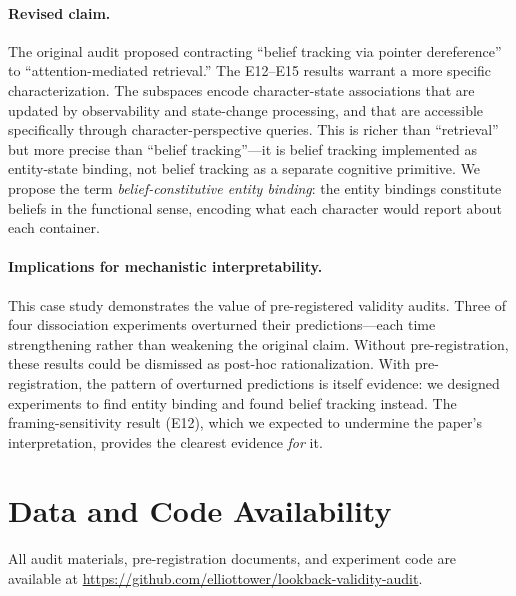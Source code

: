 \documentclass[11pt]{article}
\begin{document}
\paragraph{Revised claim.}
The original audit proposed contracting ``belief tracking via pointer dereference'' to ``attention-mediated retrieval.'' The E12--E15 results warrant a more specific characterization. The subspaces encode character-state associations that are updated by observability and state-change processing, and that are accessible specifically through character-perspective queries. This is richer than ``retrieval'' but more precise than ``belief tracking''---it is belief tracking implemented as entity-state binding, not belief tracking as a separate cognitive primitive. We propose the term \emph{belief-constitutive entity binding}: the entity bindings constitute beliefs in the functional sense, encoding what each character would report about each container.

\paragraph{Implications for mechanistic interpretability.}
This case study demonstrates the value of pre-registered validity audits. Three of four dissociation experiments overturned their predictions---each time strengthening rather than weakening the original claim. Without pre-registration, these results could be dismissed as post-hoc rationalization. With pre-registration, the pattern of overturned predictions is itself evidence: we designed experiments to find entity binding and found belief tracking instead. The framing-sensitivity result (E12), which we expected to undermine the paper's interpretation, provides the clearest evidence \emph{for} it.


\section*{Data and Code Availability}

All audit materials, pre-registration documents, and experiment code are available at \url{https://github.com/elliottower/lookback-validity-audit}.



\end{document}
